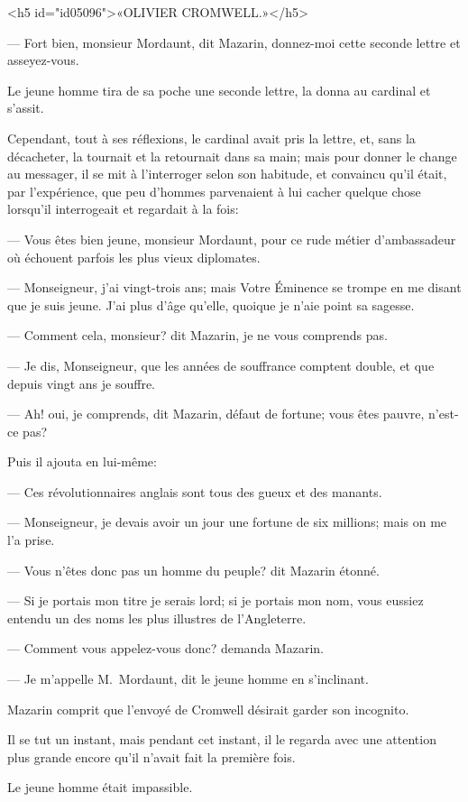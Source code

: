 <h5 id="id05096">«OLIVIER CROMWELL.»</h5>

— Fort bien, monsieur Mordaunt, dit Mazarin, donnez-moi cette seconde lettre et asseyez-vous.

Le jeune homme tira de sa poche une seconde lettre, la donna au cardinal et s'assit.

Cependant, tout à ses réflexions, le cardinal avait pris la lettre, et, sans la décacheter, la tournait et la retournait dans sa main; mais pour donner le change au messager, il se mit à l'interroger selon son habitude, et convaincu qu'il était, par l'expérience, que peu d'hommes parvenaient à lui cacher quelque chose lorsqu'il interrogeait et regardait à la fois:

— Vous êtes bien jeune, monsieur Mordaunt, pour ce rude métier d'ambassadeur où échouent parfois les plus vieux diplomates.

— Monseigneur, j'ai vingt-trois ans; mais Votre Éminence se trompe en me disant que je suis jeune. J'ai plus d'âge qu'elle, quoique je n'aie point sa sagesse.

— Comment cela, monsieur? dit Mazarin, je ne vous comprends pas.

— Je dis, Monseigneur, que les années de souffrance comptent double, et que depuis vingt ans je souffre.

— Ah! oui, je comprends, dit Mazarin, défaut de fortune; vous êtes pauvre, n'est-ce pas?

Puis il ajouta en lui-même:

— Ces révolutionnaires anglais sont tous des gueux et des manants.

— Monseigneur, je devais avoir un jour une fortune de six millions; mais on me l'a prise.

— Vous n'êtes donc pas un homme du peuple? dit Mazarin étonné.

— Si je portais mon titre je serais lord; si je portais mon nom, vous eussiez entendu un des noms les plus illustres de l'Angleterre.

— Comment vous appelez-vous donc? demanda Mazarin.

— Je m'appelle M.~Mordaunt, dit le jeune homme en s'inclinant.

Mazarin comprit que l'envoyé de Cromwell désirait garder son incognito.

Il se tut un instant, mais pendant cet instant, il le regarda avec une attention plus grande encore qu'il n'avait fait la première fois.

Le jeune homme était impassible.

